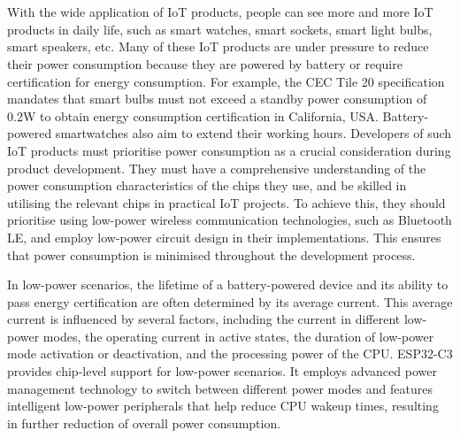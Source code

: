 \documentclass[a4paper,12pt]{book}
\begin{document}

{\makeatletter
\let\ps@plain\ps@empty
\makeatother
\part[Optimisation and Mass Production]{}
}

\chapter[Power Management and Low-Power Optimisation]{}

\vspace{36pt}
With the wide application of IoT products, people can see more and more IoT products in daily life, such as smart watches, smart sockets, smart light bulbs, smart speakers, etc. Many of these IoT products are under pressure to reduce their power consumption because they are powered by battery or require certification for energy consumption. For example, the CEC Tile 20 specification mandates that smart bulbs must not exceed a standby power consumption of 0.2W to obtain energy consumption certification in California, USA. Battery-powered smartwatches also aim to extend their working hours. Developers of such IoT products must prioritise power consumption as a crucial consideration during product development. They must have a comprehensive understanding of the power consumption characteristics of the chips they use, and be skilled in utilising the relevant chips in practical IoT projects. To achieve this, they should prioritise using low-power wireless communication technologies, such as Bluetooth LE, and employ low-power circuit design in their implementations. This ensures that power consumption is minimised throughout the development process.

In low-power scenarios, the lifetime of a battery-powered device and its ability to pass energy certification are often determined by its average current. This average current is influenced by several factors, including the current in different low-power modes, the operating current in active states, the duration of low-power mode activation or deactivation, and the processing power of the CPU. ESP32-C3 provides chip-level support for low-power scenarios. It employs advanced power management technology to switch between different power modes and features intelligent low-power peripherals that help reduce CPU wakeup times, resulting in further reduction of overall power consumption.
\end{document}
